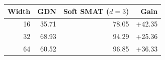 \begin{tabular}{rrrr}
\toprule
Width & GDN & Soft SMAT ($d=3$) & Gain \\
\midrule
16 & 35.71 & 78.05 & +42.35 \\
32 & 68.93 & 94.29 & +25.36 \\
64 & 60.52 & 96.85 & +36.33 \\
\bottomrule
\end{tabular}
